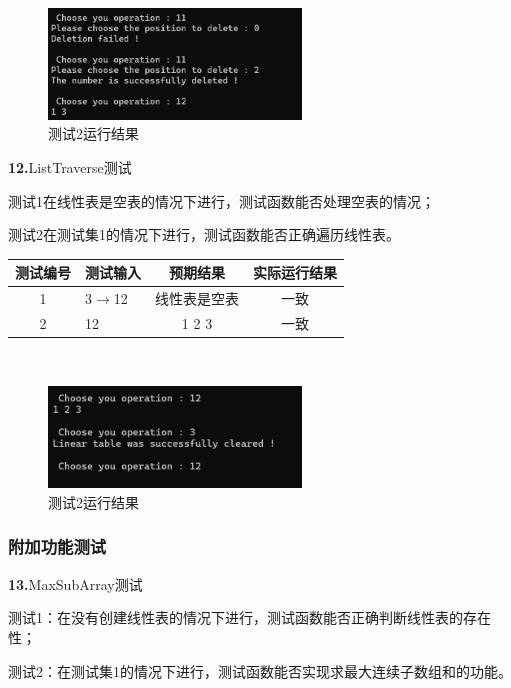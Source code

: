 \documentclass[supercite]{Experimental_Report}
\theoremstyle{definition}
\begin{document}
 \begin{figure}[H]
 	\centering
 	\includegraphics[width=0.6\textwidth]{images/线性表测试11.png}
 	\caption{测试2运行结果}
 	\label{txlab}
 \end{figure}


\noindent\textbf{12.}ListTraverse测试

	测试1在线性表是空表的情况下进行，测试函数能否处理空表的情况；

	测试2在测试集1的情况下进行，测试函数能否正确遍历线性表。

\vspace{0.5em}

\begin{tabular}{|c|p{2.7cm}|c|c|}
	\hline
	测试编号 & 测试输入 & 预期结果 & 实际运行结果 \\
	\hline
	1 & 3$\rightarrow$12 & 线性表是空表 & 一致 \\
	\hline
	2 & 12 & 1 2 3 & 一致 \\
	\hline
\end{tabular}

~\

 \begin{figure}[H]
 	\centering
 	\includegraphics[width=0.6\textwidth]{images/线性表测试12.png}
 	\caption{测试2运行结果}
 	\label{txlab}
 \end{figure}


\subsubsection{附加功能测试}

\noindent\textbf{13.}MaxSubArray测试

测试1：在没有创建线性表的情况下进行，测试函数能否正确判断线性表的存在性；
	
测试2：在测试集1的情况下进行，测试函数能否实现求最大连续子数组和的功能。
\end{document}
